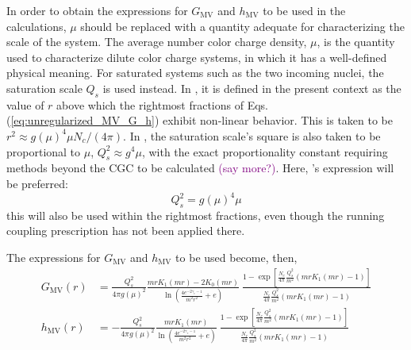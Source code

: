
In order to obtain the expressions for $G_\text{MV}$ and $h_\text{MV}$ to be used in the calculations, $\mu$ should be replaced with a quantity adequate for characterizing the scale of the system. The average number color charge density, $\mu$, is the quantity used to characterize dilute color charge systems, in which it has a well-defined physical meaning. For saturated systems such as the two incoming nuclei, the saturation scale $Q_s$ is used instead. In \cite{Guerrero_Rodr_guez_2021}, it is defined in the present context as the value of $r$ above which the rightmost fractions of Eqs. (\ref{eq:unregularized_MV_G_h}) exhibit non-linear behavior. This is taken to be $r^2 \approx g(\mu)^4 \mu N_c / (4 \pi)$. In \cite{Carrington_2022}, the saturation scale's square is also taken to be proportional to $\mu$, $Q_s^2 \approx g^4 \mu$, with the exact proportionality constant requiring methods beyond the \gls{CGC} to be calculated \textcolor{purple}{(say more?)}. Here, \cite{Carrington_2022}'s expression will be preferred:
\begin{equation}
Q_s^2 = g(\mu)^4 \mu
\end{equation} 
this will also be used within the rightmost fractions, even though the running coupling prescription has not been applied there.

The expressions for $G_\text{MV}$ and $h_\text{MV}$ to be used become, then,
\begin{subequations}
\begin{align}
G_{\text{MV}}(r) & = \frac{Q_s^2}{4\pi g(\mu)^{2}} \frac{ mrK_{1}(mr) - 2K_{0}(mr) } {\ln\left( \frac{4e^{-2\gamma_e-1}}{m^2 r^2} + e\right)}
~ \frac{1 - \exp \left [\frac{N_c}{4\pi} \frac{Q_s^2}{m^2} (mrK_{1}(mr) - 1) \right ]}{\frac{N_c}{4\pi} \frac{Q_s^2}{m^2} (mrK_{1}(mr) - 1)} \\
h_{\text{MV}}(r) & = - \frac{Q_s^2}{4\pi g(\mu)^{2}} \frac{mrK_{1}(mr)}{\ln\left( \frac{4e^{-2\gamma_e-1}}{m^2 r^2} + e\right)} 
~ \frac{1 - \exp \left [ \frac{N_c}{4\pi} \frac{Q_s^2}{m^2} (mrK_{1}(mr) - 1) \right ]}{\frac{N_c}{4\pi} \frac{Q_s^2}{m^2} (mrK_{1}(mr) - 1)}
\end{align}
\label{eq:regularized_MV_G_h}
\end{subequations}

